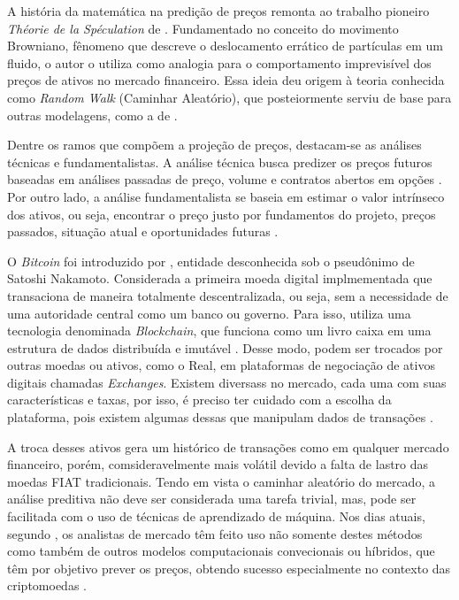 A história da matemática na predição de preços remonta ao trabalho pioneiro \textit{Théorie de la Spéculation} de \textcite{Bachelier} \cite{Courtault}. Fundamentado no conceito do movimento Browniano, 
fênomeno que descreve o deslocamento errático de partículas em um fluido, o autor o utiliza como analogia para o comportamento imprevisível dos preços de ativos no mercado financeiro. 
Essa ideia deu origem à teoria conhecida como \textit{Random Walk} (Caminhar Aleatório), que posteiormente serviu de base para outras modelagens, como a de \textcite{blacksholes}.

Dentre os ramos que compõem a projeção de preços, destacam-se as análises técnicas e fundamentalistas.
A análise técnica busca predizer os preços futuros baseadas em análises passadas de preço, volume e contratos abertos em opções \cite{Pring}.
Por outro lado, a análise fundamentalista se baseia em estimar o valor intrínseco dos ativos, ou seja, encontrar o preço justo por fundamentos do projeto, preços passados, situação atual e oportunidades futuras \cite{Ahmed}.

O \textit{Bitcoin} foi introduzido por \textcite{Nakamoto}, entidade desconhecida sob o pseudônimo de Satoshi Nakamoto. 
Considerada a primeira moeda digital implmementada que transaciona de maneira totalmente descentralizada, ou seja, sem a necessidade de uma autoridade central como um banco ou governo. 
Para isso, utiliza uma tecnologia denominada \textit{Blockchain}, que funciona como um livro caixa em uma estrutura de dados distribuída e imutável \cite{Ledger}. Desse modo, podem ser trocados por outras moedas ou ativos, como o Real, em plataformas de negociação de ativos digitais chamadas \textit{Exchanges}.
Existem diversass no mercado, cada uma com suas características e taxas, por isso, é preciso ter cuidado com a escolha da plataforma, pois existem algumas dessas que manipulam dados de transações \cite{FakeExchanges}.

A troca desses ativos gera um histórico de transações como em qualquer mercado financeiro,
porém, comsideravelmente mais volátil devido a falta de lastro das moedas FIAT tradicionais. 
Tendo em vista o caminhar aleatório do mercado, a análise preditiva não deve ser considerada uma tarefa trivial, mas, pode ser facilitada com o uso de técnicas de aprendizado de máquina.
Nos dias atuais, segundo \textcite{Fang}, os analistas de mercado têm feito uso não somente destes métodos como também de outros modelos computacionais convecionais ou híbridos, que têm por objetivo prever os preços, obtendo sucesso especialmente no contexto das criptomoedas \cite{Atsalakis}.


